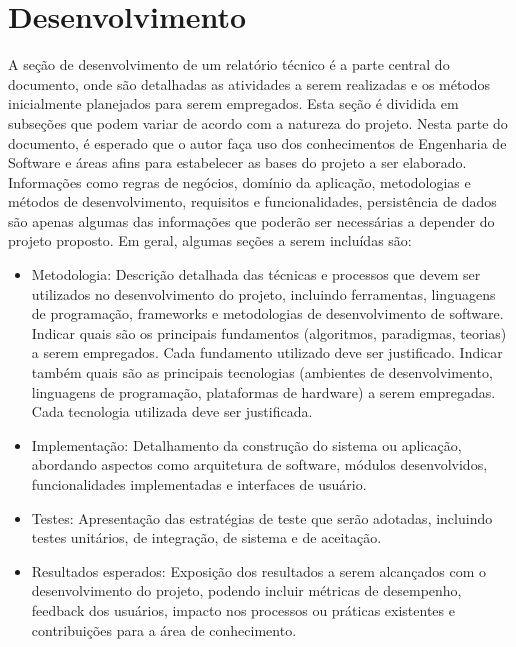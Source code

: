 \chapter{Desenvolvimento}

A seção de desenvolvimento de um relatório técnico é a parte central do documento, onde são detalhadas as atividades a serem realizadas e os métodos inicialmente planejados para serem empregados. Esta seção é dividida em subseções que podem variar de acordo com a natureza do projeto. 
Nesta parte do documento, é esperado que o autor faça uso dos conhecimentos de Engenharia de Software e áreas afins para estabelecer as bases do projeto a ser elaborado. Informações como regras de negócios, domínio da aplicação, metodologias e métodos de desenvolvimento, requisitos e funcionalidades, persistência de dados são apenas algumas das informações que poderão ser necessárias a depender do projeto proposto.  Em geral, algumas seções a serem incluídas são: 

\begin{itemize}
    \item Metodologia: Descrição detalhada das técnicas e processos que devem ser utilizados no desenvolvimento do projeto, incluindo ferramentas, linguagens de programação, frameworks e metodologias de desenvolvimento de software. Indicar quais são os principais fundamentos (algoritmos, paradigmas, teorias) a serem empregados. Cada fundamento utilizado deve ser justificado. Indicar também quais são as principais tecnologias (ambientes de desenvolvimento, linguagens de programação, plataformas de hardware) a serem empregadas. Cada tecnologia utilizada deve ser justificada. 

    \item Implementação: Detalhamento da construção do sistema ou aplicação, abordando aspectos como arquitetura de software, módulos desenvolvidos, funcionalidades implementadas e interfaces de usuário.

    \item Testes: Apresentação das estratégias de teste que serão adotadas, incluindo testes unitários, de integração, de sistema e de aceitação.

    \item Resultados esperados: Exposição dos resultados a serem alcançados com o desenvolvimento do projeto, podendo incluir métricas de desempenho, feedback dos usuários, impacto nos processos ou práticas existentes e contribuições para a área de conhecimento.
\end{itemize}


